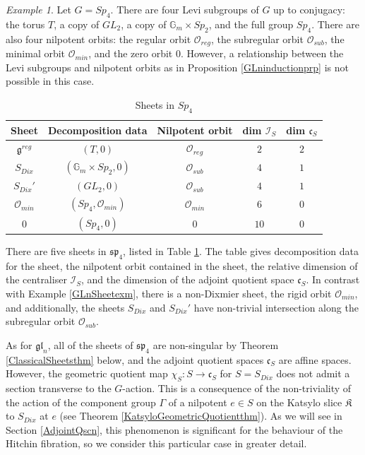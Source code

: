 \documentclass{amsart}
\theoremstyle{remark}
\newtheorem{example}[theorem]{Example}
\numberwithin{theorem}{section}
\numberwithin{equation}{section}
\begin{document}
\begin{example}\label{Sp4Sheetexm}
    Let $G=Sp_4$. There are four Levi subgroups of $G$ up to conjugacy: the torus $T$, a copy of $GL_2$, a copy of $\mathbb{G}_m \times Sp_2$, and the full group $Sp_4$. There are also four nilpotent orbits: the regular orbit $\mathcal O_{reg}$, the subregular orbit $\mathcal O_{sub}$, the minimal orbit $\mathcal O_{min}$, and the zero orbit $0$. However, a relationship between the Levi subgroups and nilpotent orbits as in Proposition \ref{GLninductionprp} is not possible in this case.
    
    \begin{table}[ht]
        \centering
        \caption{Sheets in $Sp_4$}
        \begin{tabular}{|c|c|c|c|c|}
        \hline
            Sheet&Decomposition data & Nilpotent orbit & dim $\mathcal I_S$ & dim $\mathfrak{c}_S$  \\
            \hline
             $\mathfrak{g}^{reg}$ & $(T,0)$& $\mathcal O_{reg}$ & $2$ & $2$ \\
             $S_{Dix}$&$(\mathbb{G}_m \times Sp_2,0)$ & $\mathcal O_{sub}$ & $4$ & $1$ \\
             $S_{Dix}'$&$(GL_2,0)$& $\mathcal O_{sub}$ & $4$ & $1$ \\
             $\mathcal O_{min}$&$(Sp_4,\mathcal O_{min})$ & $\mathcal O_{min}$ & $6$ & $0$ \\
             $0$&$(Sp_4,0)$ & $0$ & $10$ & $0$ \\
             \hline
        \end{tabular}
        \label{Sp4Sheettbl}
    \end{table}
    There are five sheets in $\mathfrak{sp}_4$, listed in Table \ref{Sp4Sheettbl}. The table gives decomposition data for the sheet, the nilpotent orbit contained in the sheet, the relative dimension of the centraliser $\mathcal I_S$, and the dimension of the adjoint quotient space $\mathfrak{c}_S$. In contrast with Example \ref{GLnSheetexm}, there is a non-Dixmier sheet, the  rigid orbit $\mathcal O_{min}$, and additionally, the sheets $S_{Dix}$ and $S_{Dix}'$ have non-trivial intersection along the subregular orbit $\mathcal O_{sub}$.

    As for $\mathfrak{gl}_n$, all of the sheets of $\mathfrak{sp}_4$ are non-singular by Theorem \ref{ClassicalSheetsthm} below, and the adjoint quotient spaces $\mathfrak{c}_S$ are affine spaces. However, the geometric quotient map $\chi_S:S \rightarrow \mathfrak{c}_S$ for $S=S_{Dix}$ does not admit a section transverse to the $G$-action. This is a consequence of the non-triviality of the action of the component group $\Gamma$ of a nilpotent $e \in S$ on the Katsylo slice $\mathfrak{K}$ to $S_{Dix}$ at $e$ (see Theorem \ref{KatsyloGeometricQuotientthm}). As we will see in Section \ref{AdjointQscn}, this phenomenon is significant for the behaviour of the Hitchin fibration, so we consider this particular case in greater detail.


\end{example}
\end{document}
